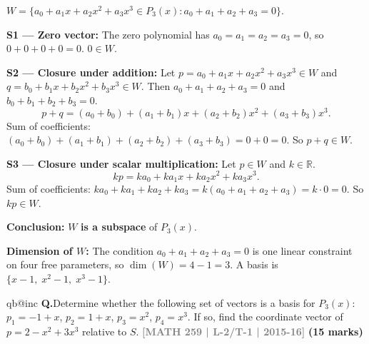 \documentclass[12pt,a3paper]{article}
\makeatletter
\newcommand{\yr}[1]{\hfill\textcolor{gray}{\small\textbf{[#1]}}}
\newcommand{\mk}[1]{\textcolor{orange!70!black}{\small\textbf{(#1 marks)}}}
\newcounter{qnum}
\newcommand{\Q}[1]{%
  \csname qb@inc\endcsname
  \needspace{4\baselineskip}
  \refstepcounter{qnum}
  \vspace{6pt}
  \noindent\textbf{Q\theqnum.}\enspace #1\par
}
\makeatother
\begin{document}
\begin{tcolorbox}[enhanced,breakable,colback=cC!4,colframe=cC,
  boxrule=0.8pt,arc=5pt,
  title={\textbf{Answer}},
  fonttitle=\bfseries\color{white},colbacktitle=cC]

$W = \{a_0+a_1x+a_2x^2+a_3x^3 \in P_3(x) : a_0+a_1+a_2+a_3=0\}$.

\textbf{S1 --- Zero vector:} The zero polynomial has $a_0=a_1=a_2=a_3=0$, so $0+0+0+0=0$. $0\in W$. \checkmark

\textbf{S2 --- Closure under addition:} Let $p=a_0+a_1x+a_2x^2+a_3x^3\in W$ and $q=b_0+b_1x+b_2x^2+b_3x^3\in W$.  Then $a_0+a_1+a_2+a_3=0$ and $b_0+b_1+b_2+b_3=0$.
\[
  p+q = (a_0+b_0)+(a_1+b_1)x+(a_2+b_2)x^2+(a_3+b_3)x^3.
\]
Sum of coefficients: $(a_0+b_0)+(a_1+b_1)+(a_2+b_2)+(a_3+b_3) = 0+0=0$. So $p+q\in W$. \checkmark

\textbf{S3 --- Closure under scalar multiplication:} Let $p\in W$ and $k\in\mathbb{R}$.
\[
  kp = ka_0+ka_1x+ka_2x^2+ka_3x^3.
\]
Sum of coefficients: $ka_0+ka_1+ka_2+ka_3 = k(a_0+a_1+a_2+a_3)=k\cdot 0=0$. So $kp\in W$. \checkmark

\textbf{Conclusion:} $W$ \textbf{is a subspace} of $P_3(x)$.

\medskip
\textbf{Dimension of $W$:} The condition $a_0+a_1+a_2+a_3=0$ is one linear constraint on four free parameters, so $\dim(W)=4-1=3$.  A basis is $\{x-1,\;x^2-1,\;x^3-1\}$.
\end{tcolorbox}

\Q{Determine whether the following set of vectors is a basis for $P_3(x)$: $p_1 = -1 + x$, $p_2 = 1 + x$, $p_3 = x^2$, $p_4 = x^3$. If so, find the coordinate vector of $p = 2 - x^2 + 3x^3$ relative to $S$.
\yr{MATH 259 | L-2/T-1 | 2015-16} \mk{15}}
\end{document}
